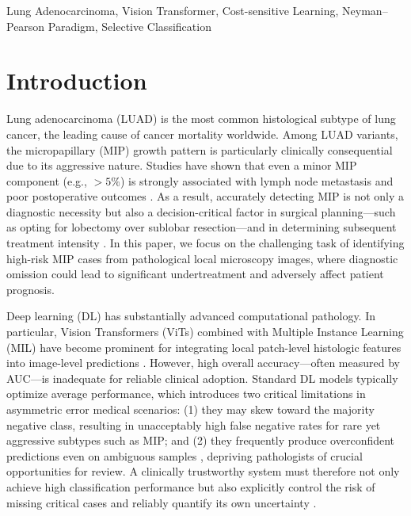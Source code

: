 \documentclass[journal,twoside,web]{ieeecolor}
\begin{document}
\begin{IEEEkeywords}
Lung Adenocarcinoma, Vision Transformer, Cost-sensitive Learning, Neyman--Pearson Paradigm, Selective Classification
\end{IEEEkeywords}


\section{Introduction}

Lung adenocarcinoma (LUAD) is the most common histological subtype of lung cancer, the leading cause of cancer mortality worldwide. Among LUAD variants, the micropapillary (MIP) growth pattern is particularly clinically consequential due to its aggressive nature. Studies have shown that even a minor MIP component (e.g., $>5\%$) is strongly associated with lymph node metastasis and poor postoperative outcomes \cite{caso2020underlying, dai2017tumor}. As a result, accurately detecting MIP is not only a diagnostic necessity but also a decision-critical factor in surgical planning—such as opting for lobectomy over sublobar resection—and in determining subsequent treatment intensity \cite{dai2017tumor}. In this paper, we focus on the challenging task of identifying high-risk MIP cases from pathological local microscopy images, where diagnostic omission could lead to significant undertreatment and adversely affect patient prognosis.


Deep learning (DL) has substantially advanced computational pathology. In particular, Vision Transformers (ViTs) \cite{dosovitskiy2020image} combined with Multiple Instance Learning (MIL) \cite{ilse2018attention} have become prominent for integrating local patch-level histologic features into image-level predictions \cite{campanella2019clinical, lu2021data, ilse2018attention}. However, high overall accuracy—often measured by AUC—is inadequate for reliable clinical adoption. Standard DL models typically optimize average performance, which introduces two critical limitations in asymmetric error medical scenarios: (1) they may skew toward the majority negative class, resulting in unacceptably high false negative rates for rare yet aggressive subtypes such as MIP; and (2) they frequently produce overconfident predictions even on ambiguous samples \cite{hendrycks2016baseline}, depriving pathologists of crucial opportunities for review. A clinically trustworthy system must therefore not only achieve high classification performance but also explicitly control the risk of missing critical cases and reliably quantify its own uncertainty \cite{dvijotham2023enhancing}.
\end{document}

